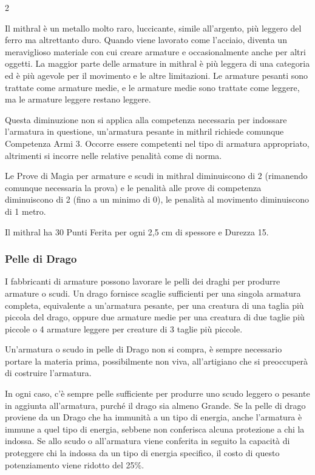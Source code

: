 \begin{multicols}{2}
\medskip

Il mithral è un metallo molto raro, luccicante, simile all'argento, più leggero del ferro ma altrettanto duro. Quando viene lavorato come l'acciaio, diventa un meraviglioso materiale con cui creare armature e occasionalmente anche per altri oggetti. La maggior parte delle armature in mithral è più leggera di una categoria ed è più agevole per il movimento e le altre limitazioni. Le armature pesanti sono trattate come armature medie, e le armature medie sono trattate come leggere, ma le armature leggere restano leggere.

Questa diminuzione non si applica alla competenza necessaria per indossare l'armatura in questione, un'armatura pesante in mithril richiede comunque Competenza Armi 3. Occorre essere competenti nel tipo di armatura appropriato, altrimenti si incorre nelle relative penalità come di norma.

Le Prove di Magia per armature e scudi in mithral diminuiscono di 2 (rimanendo comunque necessaria la prova) e le penalità alle prove di competenza diminuiscono di 2 (fino a un minimo di 0), le penalità al movimento diminuiscono di 1 metro.

Il mithral ha 30 Punti Ferita per ogni 2,5 cm di spessore e Durezza 15.

\subsubsection{Pelle di Drago}

\label{pelle-di-drago}

I fabbricanti di armature possono lavorare le pelli dei draghi per produrre armature o scudi.
Un drago fornisce scaglie sufficienti per una singola armatura completa, equivalente a un'armatura pesante, per una creatura di una taglia più piccola del drago, oppure due armature medie per una creatura di due taglie più piccole o 4 armature leggere per creature di 3 taglie più piccole.

Un'armatura o scudo in pelle di Drago non si compra, è sempre necessario portare la materia prima, possibilmente non viva, all'artigiano che si preoccuperà di costruire l'armatura.

In ogni caso, c'è sempre pelle sufficiente per produrre uno scudo leggero o pesante in aggiunta all'armatura, purché il drago sia almeno Grande.
Se la pelle di drago proviene da un Drago che ha immunità a un tipo di energia, anche l'armatura è immune a quel tipo di energia, sebbene non conferisca alcuna protezione a chi la indossa. Se allo scudo o all'armatura viene conferita in seguito la capacità di proteggere chi la indossa da un tipo di energia specifico, il costo di questo potenziamento viene ridotto del 25\%.


\end{multicols}
